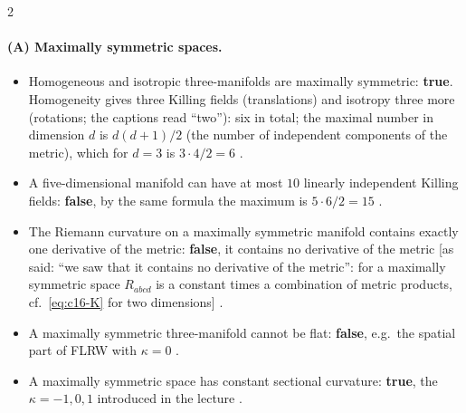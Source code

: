 \begin{paracol}{2}
\paragraph{(A) Maximally symmetric spaces.}
\begin{itemize}
  \item Homogeneous and isotropic three-manifolds are maximally symmetric: \textbf{true}. Homogeneity gives three Killing fields (translations) and isotropy three more (rotations; the captions read ``two''): six in total; the maximal number in dimension $d$ is $d(d+1)/2$ (the number of independent components of the metric), which for $d=3$ is $3\cdot4/2=6$ .
  \item A five-dimensional manifold can have at most $10$ linearly independent Killing fields: \textbf{false}, by the same formula the maximum is $5\cdot6/2=15$ .
  \item The Riemann curvature on a maximally symmetric manifold contains exactly one derivative of the metric: \textbf{false}, it contains no derivative of the metric [as said: ``we saw that it contains no derivative of the metric'': for a maximally symmetric space $R_{abcd}$ is a constant times a combination of metric products, cf.\ \eqref{eq:c16-K} for two dimensions] .
  \item A maximally symmetric three-manifold cannot be flat: \textbf{false}, e.g.\ the spatial part of FLRW with $\kappa=0$ .
  \item A maximally symmetric space has constant sectional curvature: \textbf{true}, the $\kappa=-1,0,1$ introduced in the lecture .
\end{itemize}


\end{paracol}
